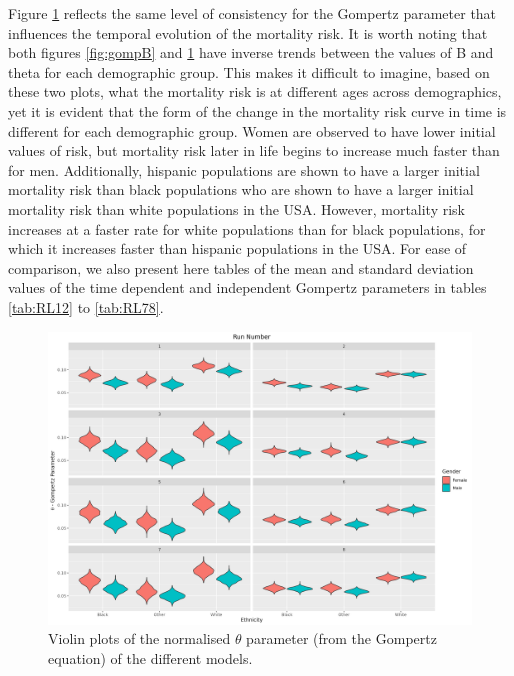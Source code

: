 \documentclass[
]{article}
\begin{document}
Figure \ref{fig:gompt} reflects the same level of consistency for the Gompertz parameter that influences the temporal evolution of the mortality risk. It is worth noting that both figures \ref{fig:gompB} and \ref{fig:gompt} have inverse trends between the values of B and theta for each demographic group. This makes it difficult to imagine, based on these two plots, what the mortality risk is at different ages across demographics, yet it is evident that the form of the change in the mortality risk curve in time is different for each demographic group. Women are observed to have lower initial values of risk, but mortality risk later in life begins to increase much faster than for men. Additionally, hispanic populations are shown to have a larger initial mortality risk than black populations who are shown to have a larger initial mortality risk than white populations in the USA. However, mortality risk increases at a faster rate for white populations than for black populations, for which it increases faster than hispanic populations in the USA. For ease of comparison, we also present here tables of the mean and standard deviation values of the time dependent and independent Gompertz parameters in tables \ref{tab:RL12} to \ref{tab:RL78}.

\begin{figure}
\hypertarget{fig:gompt}{%
\centering
\includegraphics{./Plots/gompertz/theta_parameter.png}
\caption{Violin plots of the normalised \(\theta\) parameter (from the Gompertz equation) of the different models.}\label{fig:gompt}
}
\end{figure}
\end{document}
